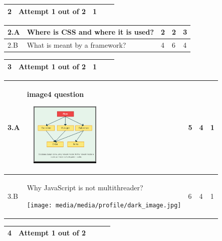 \documentclass[12pt]{article}
\begin{document}
	\begin{tabular}{L{1cm}L{9cm}C{2cm}C{2cm}C{1cm}}
	\bf2 & Attempt 1 out of 2 & 1  & & \\ \hline
\end{tabular}



\begin{tabular}{|L{1cm}|L{9cm}|C{2cm}|C{2cm}|C{1cm}|}
		2.A &
	Where is CSS and where it is used? \newline
			
	 &  2 & 2 & 3\\ \hline
		2.B &
	What is meant by a framework? \newline
			
	 &  4 & 6 & 4\\ \hline
	\end{tabular}


\begin{tabular}{L{1cm}L{9cm}C{2cm}C{2cm}C{1cm}}
	\bf3 & Attempt 1 out of 2 & 1  & & \\ \hline
\end{tabular}



\begin{tabular}{|L{1cm}|L{9cm}|C{2cm}|C{2cm}|C{1cm}|}
		3.A &
	image4 question \newline
			\begin{center}
		\includegraphics[width=4cm,height=3cm]{media/diagrams/image4.png}	
	\end{center}
		
	 &  5 & 4 & 1\\ \hline
		3.B &
	Why JavaScript is not multithreader? \newline
			\begin{center}
		\texttt{[image: media/media/profile/dark\_image.jpg]}	
	\end{center}
		
	 &  6 & 4 & 1\\ \hline
	\end{tabular}


\begin{tabular}{L{1cm}L{9cm}C{2cm}C{2cm}C{1cm}}
	\bf4 & Attempt 1 out of 2 &   & & \\ \hline
\end{tabular}
\end{document}
